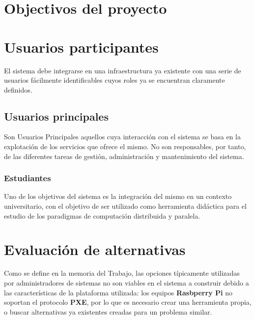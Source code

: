 \documentclass{article}
\begin{document}



\section{Objectivos del proyecto}


\section{Usuarios participantes}

El sistema debe integrarse en una infraestructura ya existente con una serie de usuarios fácilmente identificables cuyos roles ya se encuentran claramente definidos.

\subsection{Usuarios principales}

Son Usuarios Principales aquellos cuya interacción con el sistema se basa en la explotación de los servicios que ofrece el mismo. No son responsables, por tanto, de las diferentes tareas de gestión, administración y mantenimiento del sistema.

\subsubsection{Estudiantes}

Uno de los objetivos del sistema es la integración del mismo en un contexto universitario, con el objetivo de ser utilizado como herramienta didáctica para el estudio de los paradigmas de computación distribuida y paralela.

\section{Evaluación de alternativas}

Como se define en la memoria del Trabajo, las opciones típicamente utilizadas por administradores de sistemas no son viables en el sistema a construir debido a las características de la plataforma utilizada: los equipos \textbf{Rasbperry Pi} no soportan el protocolo \textbf{PXE}, por lo que es necesario crear una herramienta propia, o buscar alternativas ya existentes creadas para un problema similar.
\end{document}
